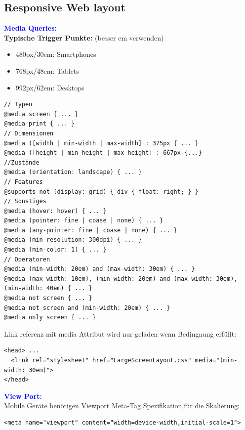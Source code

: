 \subsection{Responsive Web layout}
\textbf{\textcolor{blue}{Media Queries:}}\\
\textbf{Typische Trigger Punkte:} (besser em verwenden)
\begin{itemize}[topsep=0pt, leftmargin=3mm]
    \setlength\itemsep{-0.3em}
    \item 480px/30em: Smartphones
    \item 768px/48em: Tablets
    \item 992px/62em: Desktops
\end{itemize}
\begin{lstlisting}[style=htmlcssjs]
// Typen
@media screen { ... }
@media print { ... }
// Dimensionen
@media ([width | min-width | max-width] : 375px { ... }
@media ([height | min-height | max-height] : 667px {...}
//Zustände
@media (orientation: landscape) { ... }
// Features
@supports not (display: grid) { div { float: right; } }
// Sonstiges
@media (hover: hover) { ... }
@media (pointer: fine | coase | none) { ... }
@media (any-pointer: fine | coase | none) { ... }
@media (min-resolution: 300dpi) { ... }
@media (min-color: 1) { ... }
// Operatoren
@media (min-width: 20em) and (max-width: 30em) { ... }
@media (max-width: 10em), (min-width: 20em) and (max-width: 30em), (min-width: 40em) { ... }
@media not screen { ... }
@media not screen and (min-width: 20em) { ... }
@media only screen { ... }
\end{lstlisting}
Link referenz mit media Attribut wird nur geladen wenn Bedingnung erfüllt:
\begin{lstlisting}[style=htmlcssjs]
<head> ...
  <link rel="stylesheet" href="LargeScreenLayout.css" media="(min-width: 30em)">
</head>
\end{lstlisting}
\textbf{\textcolor{blue}{View Port:}}\\
Mobile Geräte benötigen Viewport Meta-Tag Spezifikation,für die Skalierung:
\begin{lstlisting}[style=htmlcssjs]
<meta name="viewport" content="width=device-width,initial-scale=1">
\end{lstlisting}
